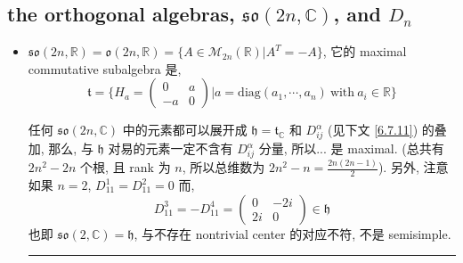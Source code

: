 \subsection{the orthogonal algebras, \texorpdfstring{$\mathfrak{so}(2 n, \mathbb{C})$}{so(2 n, C)}, and \texorpdfstring{$D_n$}{D\_n}} \label{subsection 6.7.2}
\begin{itemize}
	\item $\mathfrak{so}(2 n, \mathbb{R}) = \mathfrak{o}(2 n, \mathbb{R}) = \{A \in \mathcal{M}_{2 n}(\mathbb{R}) | A^T = - A\}$, 它的 maximal commutative subalgebra 是,
	\begin{equation}
		\mathfrak{t} = \{H_a = \begin{pmatrix}
			0 & a \\
			- a & 0
		\end{pmatrix} | a = \mathrm{diag}(a_1, \cdots, a_n) \ \text{with} \ a_i \in \mathbb{R}\}
	\end{equation}
	
	\begin{tcolorbox}[title=proof:]
		任何 $\mathfrak{so}(2 n, \mathbb{C})$ 中的元素都可以展开成 $\mathfrak{h} = \mathfrak{t}_\mathbb{C}$ 和 $D^\alpha_{i j}$ (见下文 \eqref{6.7.11}) 的叠加, 那么, 与 $\mathfrak{h}$ 对易的元素一定不含有 $D^\alpha_{i j}$ 分量, 所以... 是 maximal. (总共有 $2 n^2 - 2 n$ 个根, 且 rank 为 $n$, 所以总维数为 $2 n^2 - n = \frac{2 n (2 n - 1)}{2}$). 另外, 注意如果 $n = 2$, $D^1_{1 1} = D^2_{1 1} = 0$ 而,
		\begin{equation}
			D^3_{1 1} = - D^4_{1 1} = \begin{pmatrix}
				0 & - 2 i \\
				2 i & 0
			\end{pmatrix} \in \mathfrak{h}
		\end{equation}
		也即 $\mathfrak{so}(2, \mathbb{C}) = \mathfrak{h}$, 与不存在 nontrivial center 的对应不符, 不是 semisimple.
	\end{tcolorbox}
	
	\noindent\rule[0.5ex]{\linewidth}{0.5pt} %
	

\end{itemize}
